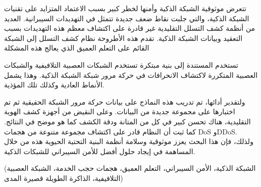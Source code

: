 \begin{abstractAr}





		تتعرض موثوقية الشبكة الذكية وأمنها لخطر كبير بسبب الاعتماد المتزايد على تقنيات الشبكة الذكية، والتي جلبت نقاط ضعف جديدة تتمثل في التهديدات السيبرانية. العديد من أنظمة كشف التسلل التقليدية  غير قادرة على اكتشاف معظم هذه التهديدات بسبب التعقيد وبيانات الشبكة الذكية. تقدم هذه الأطروحة نظام كشف التسلل إلى الشبكة القائم على التعلم العميق  الذي يعالج هذه المشكلة
		
		  تستخدم  المستندة إلى  بنية مبتكرة تستخدم الشبكات العصبية التلافيفية  والشبكات العصبية المتكررة  لاكتشاف الانحرافات في حركة مرور شبكة الشبكة الذكية. وهذا يشمل الأنماط العادية وكذلك تلك المؤذية.
		
		  ولتقدير أدائها، تم تدريب هذه النماذج على بيانات حركة مرور الشبكة الحقيقية ثم تم اختبارها على مجموعة جديدة من البيانات. وعلى النقيض من أجهزة كشف الهوية التقليدية، هناك تحسن كبير في كل من المتانة ودقة الكشف كما هو موضح في النتائج. كما ثبت أن النظام قادر على اكتشاف مجموعة متنوعة من هجمات DoS وDDoS. ولذلك، فإن هذا البحث يعزز موثوقية وسلامة أنظمة البنية التحتية الحيوية هذه من خلال المساهمة في إيجاد حلول أفضل للأمن السيبراني للشبكات الذكية.
		
		

\end{abstractAr}

\begin{keywordsAr}
	(الشبكة الذكية، الأمن السيبراني، التعلم العميق، هجمات حجب الخدمة، الشبكة العصبية التلافيفية، الذاكرة الطويلة قصيرة المدى)
\end{keywordsAr}